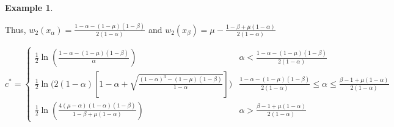 \documentclass[11pt]{article}
\theoremstyle{definition}
\newtheorem{ex}[thm]{Example}
\numberwithin{equation}{section}
\numberwithin{thm}{section}
\renewcommand{\a}{\alpha}
\renewcommand{\b}{\beta}
\newcommand{\m}{\mu}
\begin{document}
\begin{ex}
\begin{enumerate}[{Case} 1.]
Thus, $w_2(x_\a)=\frac{1-\a-(1-\m)(1-\b)}{2(1-\a)}$ and $w_2(x_\b)=\m - \frac{1-\b+\m(1-\a)}{2(1-\a)}$

\begin{equation}
c^* = \begin{cases}
\frac{1}{2} \ln \left( \frac{1-\a-(1-\m)(1-\b)}{\a} \right) & \a<\frac{1-\a-(1-\m)(1-\b)}{2(1-\a)} \\
\frac{1}{2} \ln \Big( 2(1-\a)\left[1-\a + \sqrt{\frac{(1-\a)^3-(1-\m)(1-\b) }{1-\a}}\right] \Big) & \frac{1-\a-(1-\m)(1-\b)}{2(1-\a)}\leq\a\leq\frac{\b-1+\m(1-\a)}{2(1-\a)} \\
\frac{1}{2} \ln \left( \frac{4(\m-\a)(1-\a)(1-\b)}{1-\b+\m(1-\a)}\right) & \a>\frac{\b-1+\m(1-\a)}{2(1-\a)}
\end{cases}
\end{equation}

\end{enumerate}


\end{ex}
\end{document}
